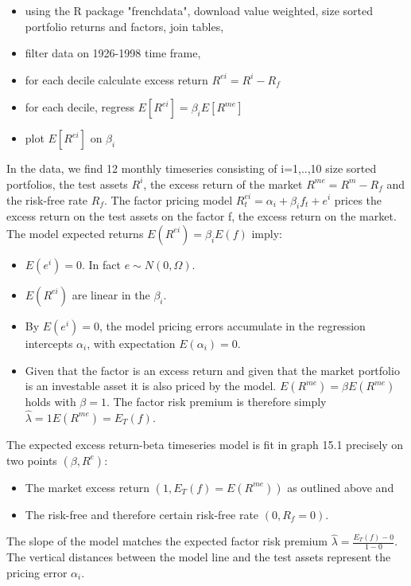\documentclass[]{article}
\begin{document}
\begin{itemize}
	\item using the R package "frenchdata", download value weighted, size sorted portfolio returns and factors, join tables,
	\item filter data on 1926-1998 time frame,
	\item for each decile calculate excess return $R^{ei} = R^{i} - R_{f}$
	\item for each decile, regress $E[R^{ei}] = \beta_i E[R^{me}]$
	\item plot $E[R^{ei}]$ on $\beta_i$
\end{itemize}

In the data, we find 12 monthly timeseries consisting of i=1,..,10 size sorted portfolios, the test assets $R^{i}$, the excess return of the market $R^{me}=R^m - R_f$ and the risk-free rate $R_f$. The factor pricing model $R_t^{ei}=\alpha_i + \beta_i f_t+e^i$ prices the excess return on the test assets on the factor f, the excess return on the market. The model expected returns $E(R^{ei})=\beta_iE(f)$ imply:
\begin{itemize}
	\item $E(e^i)=0$. In fact $e\sim N(0,\Omega)$.
	\item $E(R^{ei})$ are linear in the $\beta_i$.
	\item By $E(e^i)=0$, the model pricing errors accumulate in the regression intercepts $\alpha_i$, with expectation $E(\alpha_i)=0$.
	\item Given that the factor is an excess return and given that the market portfolio is an investable asset it is also priced by the model. $E(R^{me}) = \beta E(R^{me})$ holds with $\beta=1$. The factor risk premium is therefore simply $\hat{\lambda}=1 E(R^{me}) = E_T(f)$.
\end{itemize}

The expected excess return-beta timeseries model is fit in graph 15.1 precisely on two points $(\beta, R^e)$:
\begin{itemize}
	\item The market excess return $(1, E_T(f)=E(R^{me}))$ as outlined above and
	\item The risk-free and therefore certain risk-free rate $(0, R_f=0)$. 
\end{itemize}

The slope of the model matches the expected factor risk premium $\hat{\lambda} = \frac{E_T(f)-0}{1-0}$. The vertical distances between the model line and the test assets represent the pricing error $\alpha_i$.
\end{document}
